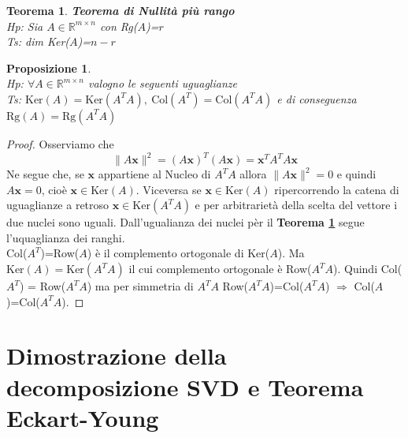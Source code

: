 \documentclass[11pt]{article}
\newtheorem{proposition}{Proposizione}
\newtheorem{theorem}{Teorema}
\newcommand{\R}{\mathbb R}
\begin{document}
\begin{theorem}\label{null}
\textbf{Teorema di Nullità più rango}\\
\textit{Hp:} Sia $A\in \R^{m \times n}$ con Rg($A$)=$r$\\
\textit{Ts:} dim Ker($A$)=$n-r$
\end{theorem}
\begin{proposition}\label{prop gal}
\textbf{}\\
\textit{Hp:} $\forall A \in \R^{m \times n}$ valogno le seguenti uguaglianze\\
\textit{Ts:} $\text{Ker}(A)=\text{Ker}(A^TA),\ \text{Col}(A^T)=\text{Col}(A^TA)$ e di conseguenza $\text{Rg}(A)=\text{Rg}(A^TA)$
\end{proposition}
\begin{proof}
Osserviamo che
$$\|A\mathbf{x}\|^2=(A\mathbf{x})^T(A\mathbf{x})=\mathbf{x}^TA^TA\mathbf{x}$$
Ne segue che, se $\mathbf{x}$ appartiene al Nucleo di $A^TA$ allora $\|A\mathbf{x}\|^2=0$ e quindi $A\mathbf{x}=0$, cioè $\mathbf{x} \in \text{Ker}(A)$. Viceversa se $ \mathbf{x} \in \text{Ker}(A)$ ripercorrendo la catena di uguaglianze a retroso $\mathbf{x} \in \text{Ker}(A^TA)$ e per arbitrarietà della scelta del vettore i due nuclei sono uguali. Dall'ugualianza dei nuclei pèr il \textbf{Teorema \ref{null}} segue l'uquaglianza dei ranghi. \\
Col($A^T$)=Row($A$) è il complemento ortogonale di Ker($A$). Ma $\text{Ker}(A)=\text{Ker}(A^TA)$ il cui complemento ortogonale è Row($A^TA$). Quindi Col($A^T$) = Row($A^TA$) ma per simmetria di $A^TA$ Row($A^TA$)=Col($A^TA$) $\Rightarrow$ Col($A$)=Col($A^TA$). 
\end{proof}

\section{Dimostrazione della decomposizione SVD e Teorema Eckart-Young}
\end{document}

